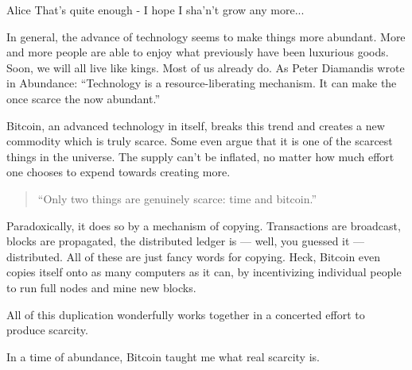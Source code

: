 
\label{les:2}

\begin{chapquote}{Alice}
That's quite enough - I hope I sha'n't grow any more...
\end{chapquote}

In general, the advance of technology seems to make things more abundant. More
and more people are able to enjoy what previously have been luxurious goods.
Soon, we will all live like kings. Most of us already do. As Peter Diamandis
wrote in Abundance\cite{abundance}: ``Technology is a resource-liberating
mechanism. It can make the once scarce the now abundant.''

Bitcoin, an advanced technology in itself, breaks this trend and creates
a new commodity which is truly scarce. Some even argue that it is one of
the scarcest things in the universe. The supply can't be inflated, no
matter how much effort one chooses to expend towards creating more.

\blockquote{
``Only two things are genuinely scarce: time and
bitcoin.'' \cite{bitcoinstandard-pres}
}

Paradoxically, it does so by a mechanism of copying. Transactions are
broadcast, blocks are propagated, the distributed ledger is --- well,
you guessed it --- distributed. All of these are just fancy words for
copying. Heck, Bitcoin even copies itself onto as many computers as it
can, by incentivizing individual people to run full nodes and mine new
blocks.

All of this duplication wonderfully works together in a concerted effort
to produce scarcity.

In a time of abundance, Bitcoin taught me what real scarcity is.

%
%
%
%
%
%
%
